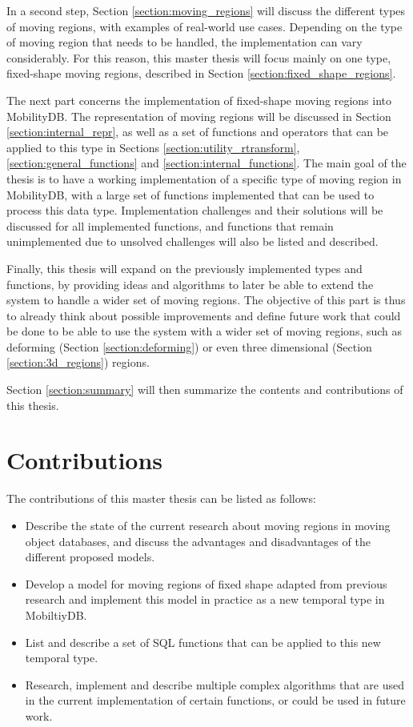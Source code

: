 In a second step, Section \ref{section:moving_regions} will discuss the different types of moving regions, with examples of real-world use cases. Depending on the type of moving region that needs to be handled, the implementation can vary considerably. For this reason, this master thesis will focus mainly on one type, fixed-shape moving regions, described in Section \ref{section:fixed_shape_regions}.

The next part concerns the implementation of fixed-shape moving regions into MobilityDB. The representation of moving regions will be discussed in Section \ref{section:internal_repr}, as well as a set of functions and operators that can be applied to this type in Sections \ref{section:utility_rtransform}, \ref{section:general_functions} and \ref{section:internal_functions}. The main goal of the thesis is to have a working implementation of a specific type of moving region in MobilityDB, with a large set of functions implemented that can be used to process this data type. Implementation challenges and their solutions will be discussed for all implemented functions, and functions that remain unimplemented due to unsolved challenges will also be listed and described.

Finally, this thesis will expand on the previously implemented types and functions, by providing ideas and algorithms to later be able to extend the system to handle a wider set of moving regions. The objective of this part is thus to already think about possible improvements and define future work that could be done to be able to use the system with a wider set of moving regions, such as deforming (Section \ref{section:deforming}) or even three dimensional (Section \ref{section:3d_regions}) regions.

Section \ref{section:summary} will then summarize the contents and contributions of this thesis.

\section{Contributions}

The contributions of this master thesis can be listed as follows:

\begin{itemize}
    \item Describe the state of the current research about moving regions in moving object databases, and discuss the advantages and disadvantages of the different proposed models.
    \item Develop a model for moving regions of fixed shape adapted from previous research and implement this model in practice as a new temporal type in MobiltiyDB.
    \item List and describe a set of SQL functions that can be applied to this new temporal type.
    \item Research, implement and describe multiple complex algorithms that are used in the current implementation of certain functions, or could be used in future work.
\end{itemize}

